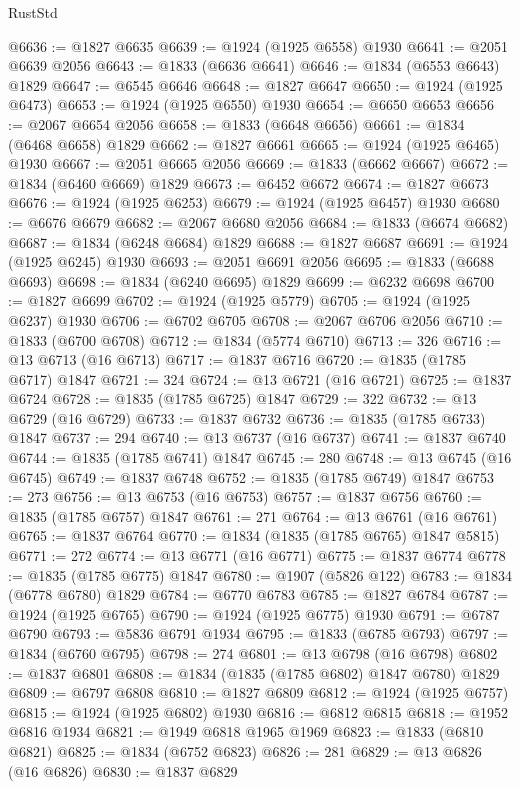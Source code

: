 \begin{lexlean}{RustStd}
\begin{coremodule}
@6636 := @1827 @6635
@6639 := @1924 (@1925 @6558) @1930
@6641 := @2051 @6639 @2056
@6643 := @1833 (@6636 @6641)
@6646 := @1834 (@6553 @6643) @1829
@6647 := @6545 @6646
@6648 := @1827 @6647
@6650 := @1924 (@1925 @6473)
@6653 := @1924 (@1925 @6550) @1930
@6654 := @6650 @6653
@6656 := @2067 @6654 @2056
@6658 := @1833 (@6648 @6656)
@6661 := @1834 (@6468 @6658) @1829
@6662 := @1827 @6661
@6665 := @1924 (@1925 @6465) @1930
@6667 := @2051 @6665 @2056
@6669 := @1833 (@6662 @6667)
@6672 := @1834 (@6460 @6669) @1829
@6673 := @6452 @6672
@6674 := @1827 @6673
@6676 := @1924 (@1925 @6253)
@6679 := @1924 (@1925 @6457) @1930
@6680 := @6676 @6679
@6682 := @2067 @6680 @2056
@6684 := @1833 (@6674 @6682)
@6687 := @1834 (@6248 @6684) @1829
@6688 := @1827 @6687
@6691 := @1924 (@1925 @6245) @1930
@6693 := @2051 @6691 @2056
@6695 := @1833 (@6688 @6693)
@6698 := @1834 (@6240 @6695) @1829
@6699 := @6232 @6698
@6700 := @1827 @6699
@6702 := @1924 (@1925 @5779)
@6705 := @1924 (@1925 @6237) @1930
@6706 := @6702 @6705
@6708 := @2067 @6706 @2056
@6710 := @1833 (@6700 @6708)
@6712 := @1834 (@5774 @6710)
@6713 := 326
@6716 := @13 @6713 (@16 @6713)
@6717 := @1837 @6716
@6720 := @1835 (@1785 @6717) @1847
@6721 := 324
@6724 := @13 @6721 (@16 @6721)
@6725 := @1837 @6724
@6728 := @1835 (@1785 @6725) @1847
@6729 := 322
@6732 := @13 @6729 (@16 @6729)
@6733 := @1837 @6732
@6736 := @1835 (@1785 @6733) @1847
@6737 := 294
@6740 := @13 @6737 (@16 @6737)
@6741 := @1837 @6740
@6744 := @1835 (@1785 @6741) @1847
@6745 := 280
@6748 := @13 @6745 (@16 @6745)
@6749 := @1837 @6748
@6752 := @1835 (@1785 @6749) @1847
@6753 := 273
@6756 := @13 @6753 (@16 @6753)
@6757 := @1837 @6756
@6760 := @1835 (@1785 @6757) @1847
@6761 := 271
@6764 := @13 @6761 (@16 @6761)
@6765 := @1837 @6764
@6770 := @1834 (@1835 (@1785 @6765) @1847 @5815)
@6771 := 272
@6774 := @13 @6771 (@16 @6771)
@6775 := @1837 @6774
@6778 := @1835 (@1785 @6775) @1847
@6780 := @1907 (@5826 @122)
@6783 := @1834 (@6778 @6780) @1829
@6784 := @6770 @6783
@6785 := @1827 @6784
@6787 := @1924 (@1925 @6765)
@6790 := @1924 (@1925 @6775) @1930
@6791 := @6787 @6790
@6793 := @5836 @6791 @1934
@6795 := @1833 (@6785 @6793)
@6797 := @1834 (@6760 @6795)
@6798 := 274
@6801 := @13 @6798 (@16 @6798)
@6802 := @1837 @6801
@6808 := @1834 (@1835 (@1785 @6802) @1847 @6780) @1829
@6809 := @6797 @6808
@6810 := @1827 @6809
@6812 := @1924 (@1925 @6757)
@6815 := @1924 (@1925 @6802) @1930
@6816 := @6812 @6815
@6818 := @1952 @6816 @1934
@6821 := @1949 @6818 @1965 @1969
@6823 := @1833 (@6810 @6821)
@6825 := @1834 (@6752 @6823)
@6826 := 281
@6829 := @13 @6826 (@16 @6826)
@6830 := @1837 @6829

\end{coremodule}
\end{lexlean}

